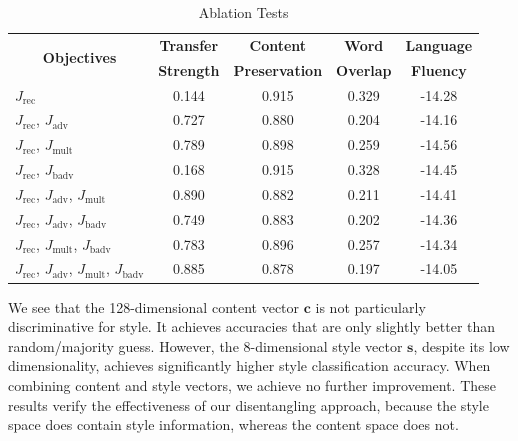 \documentclass[letterpaper]{article} %
\newcommand{\tabh}[1]{\multicolumn{1}{c|}{\textbf{#1}}}
\newcommand{\tabc}[2]{\multicolumn{1}{|c||}{\multirow{#1}{*}{\textbf{#2}}}}
\newcommand{\loss}[1]{J_\text{#1}}
\begin{document}
\begin{table}[ht]
	\centering
	\begin{tabular}{| l || c | c | c | c |}
		\hline
		\tabc{2}{Objectives}                                     & \tabh{Transfer} & \tabh{Content}      & \tabh{Word}    & \tabh{Language} \\
		                                                         & \tabh{Strength} & \tabh{Preservation} & \tabh{Overlap} & \tabh{Fluency}  \\
		\hline
		\hline
		$\loss{rec}$                                             & 0.144           & 0.915               & 0.329          & -14.28          \\
		\hline
		$\loss{rec}$, $\loss{adv}$                               & 0.727           & 0.880               & 0.204          & -14.16          \\
		\hline
		$\loss{rec}$, $\loss{mult}$                              & 0.789           & 0.898               & 0.259          & -14.56          \\
		\hline
		$\loss{rec}$, $\loss{badv}$                              & 0.168           & 0.915               & 0.328          & -14.45          \\
		\hline
		$\loss{rec}$, $\loss{adv}$, $\loss{mult}$                & 0.890           & 0.882               & 0.211          & -14.41          \\
		\hline
		$\loss{rec}$, $\loss{adv}$, $\loss{badv}$                & 0.749           & 0.883               & 0.202          & -14.36          \\
		\hline
		$\loss{rec}$, $\loss{mult}$, $\loss{badv}$               & 0.783           & 0.896               & 0.257          & -14.34          \\
		\hline
		$\loss{rec}$, $\loss{adv}$, $\loss{mult}$, $\loss{badv}$ & 0.885           & 0.878               & 0.197          & -14.05          \\
		\hline
	\end{tabular}
	\caption{Ablation Tests}
	\label{tab:ablation-results}
\end{table}

We see that the 128-dimensional content vector $\bm c$ is not particularly discriminative for style. It achieves accuracies that are only slightly better than random/majority guess. However, the 8-dimensional style vector $\bm s$, despite its low dimensionality, achieves significantly higher style classification accuracy. When combining content and style vectors, we achieve no further improvement. These results verify the effectiveness of our disentangling approach, because the style space does contain style information, whereas the content space does not.
\end{document}

